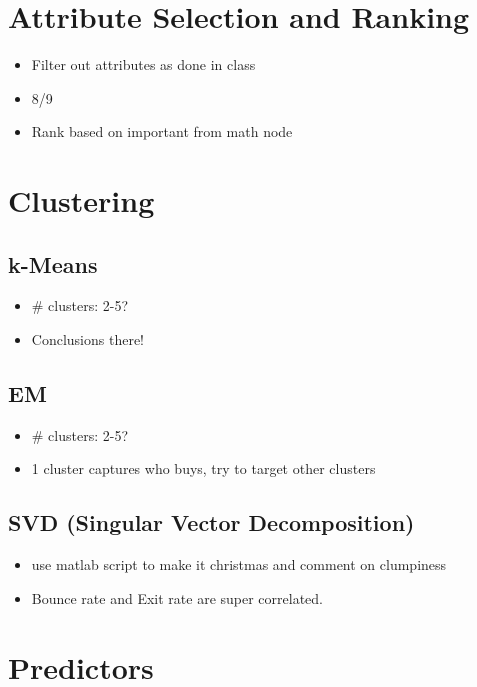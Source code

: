\documentclass[
  draft,
]{memreport}
\begin{document}
  \chapter{Attribute Selection and Ranking}

  \begin{itemize}
    \item Filter out attributes as done in class
    \item 8/9
    \item Rank based on important from math node
  \end{itemize}

  \chapter{Clustering}

  \section{k-Means}
  \begin{itemize}
    \item \# clusters: 2-5?
    \item Conclusions there!
  \end{itemize}

  \section{EM}
  \begin{itemize}
    \item \# clusters: 2-5?
    \item 1 cluster captures who buys, try to target other clusters
  \end{itemize}

  \section{SVD (Singular Vector Decomposition)}
  \begin{itemize}
    \item use matlab script to make it christmas and comment on clumpiness
    \item Bounce rate and Exit rate are super correlated.
  \end{itemize}

  \chapter{Predictors}
\end{document}
